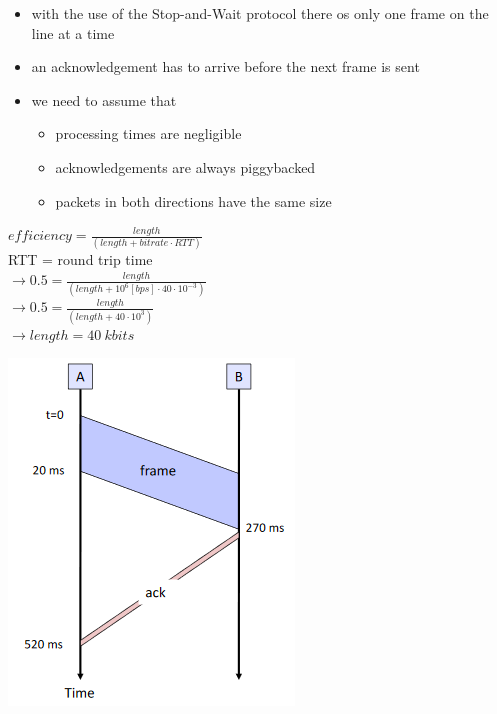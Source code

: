 \documentclass[a4paper,12pt]{article}
\begin{document}
	\begin{itemize}[itemsep=0pt]
		\item with the use of the Stop-and-Wait protocol there os only one frame on the line at a time
		\item an acknowledgement has to arrive before the next frame is sent
		\item we need to assume that
		\begin{itemize}[itemsep=0pt]
			\item processing times are negligible 
			\item acknowledgements are always piggybacked
			\item packets in both directions have the same size
		\end{itemize}
	\end{itemize}
	
	\begin{minipage}{0.49\linewidth}
		\begin{doublespace}
			$efficiency = \frac{length}{(length + bitrate \cdot RTT)} $ \\ RTT = round trip time\\
			$\rightarrow 0.5 = \frac{length}{(length + 10^6 [bps]  \cdot  40 \cdot 10^{-3})} $ \\
			$\rightarrow 0.5 = \frac{length}{(length + 40 \cdot 10^3)}$ \\
			$\rightarrow length = 40~ kbits$
		\end{doublespace}
	\end{minipage}
	\hfill
	\begin{minipage}{0.49\linewidth}
			\includegraphics[width=0.5\linewidth]{Framesize.png}
	\end{minipage}
	

	
\end{document}
